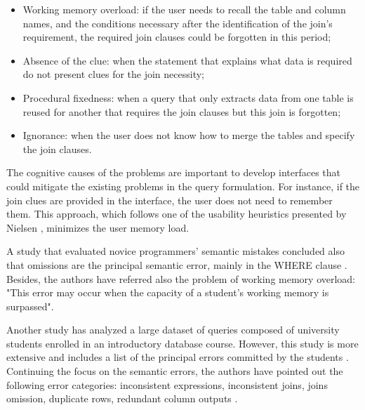\begin{itemize}
  \item Working memory overload: if the user needs to recall the table and column names, and the conditions necessary after the identification of the join's requirement, the required join clauses could be forgotten in this period;
  \item Absence of the clue: when the statement that explains what data is required do not present clues for the join necessity;
  \item Procedural fixedness: when a query that only extracts data from one table is reused for another that requires the join clauses but this join is forgotten;
  \item Ignorance:  when the user does not know how to merge the tables and specify the join clauses.
\end{itemize}

The cognitive causes of the problems are important to develop interfaces that could mitigate the existing problems in the query formulation. For instance, if the join clues are provided in the interface, the user does not need to remember them. This approach, which follows one of the usability heuristics presented by Nielsen \cite{usabilityEngineering}, minimizes the user memory load.

A study that evaluated novice programmers' semantic mistakes concluded also that omissions are the principal semantic error, mainly in the WHERE clause \cite{studentsSemanticMistakesInWritingSevenDifferentTypesOfSQLQueries}. Besides, the authors have referred also the problem of working memory overload: "This error may occur when the capacity of a student’s working memory is surpassed".

Another study has analyzed a large dataset of queries composed of university students enrolled in an introductory database course. However, this study is more extensive and includes a list of the principal errors committed by the students \cite{errorsAndComplicationsInSQLQueryFormulation}. Continuing the focus on the semantic errors, the authors have pointed out the following error categories: inconsistent expressions, inconsistent joins, joins omission, duplicate rows, redundant column outputs \cite{errorsAndComplicationsInSQLQueryFormulation}.


